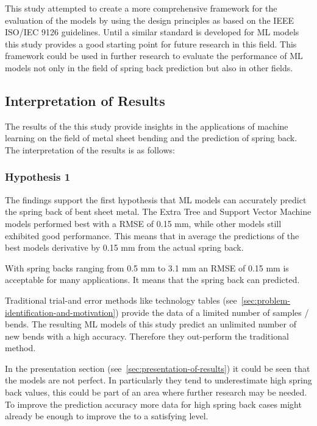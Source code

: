 This study attempted to create a more comprehensive framework for the evaluation of the models by using the design
principles as based on the IEEE ISO/IEC 9126 guidelines.
Until a similar standard is developed for \ac{ML} models this study provides a good starting point for future research
in this field.
This framework could be used in further research to evaluate the performance of \ac{ML} models not only in the field of
spring back prediction but also in other fields.

\subsection{Interpretation of Results}\label{subsec:interpretation-of-results}

The results of the this study provide insights in the applications of machine learning on the field of metal sheet
bending and the prediction of spring back.
The interpretation of the results is as follows:

\subsubsection{Hypothesis 1}
The findings support the first hypothesis that \ac{ML} models can accurately predict the spring back of bent sheet
metal.
The Extra Tree and Support Vector Machine models performed best with a RMSE of 0.15 mm, while other models still
exhibited good performance.
This means that in average the predictions of the best models derivative by 0.15 mm from the actual spring back.

With spring backs ranging from 0.5 mm to 3.1 mm an RMSE of 0.15 mm is acceptable for many applications.
It means that the spring back can predicted.

Traditional trial-and error methods like technology tables (see~\ref{sec:problem-identification-and-motivation})
provide the data of a limited number of samples / bends.
The resulting \ac{ML} models of this study predict an unlimited number of new bends with a high accuracy.
Therefore they out-perform the traditional method.

In the presentation section (see~\ref{sec:presentation-of-results}) it could be seen that the models are not perfect.
In particularly they tend to underestimate high spring back values, this could be part of an area where further research
may be needed.
To improve the prediction accuracy more data for high spring back cases might already be enough to improve the to a
satisfying level.

